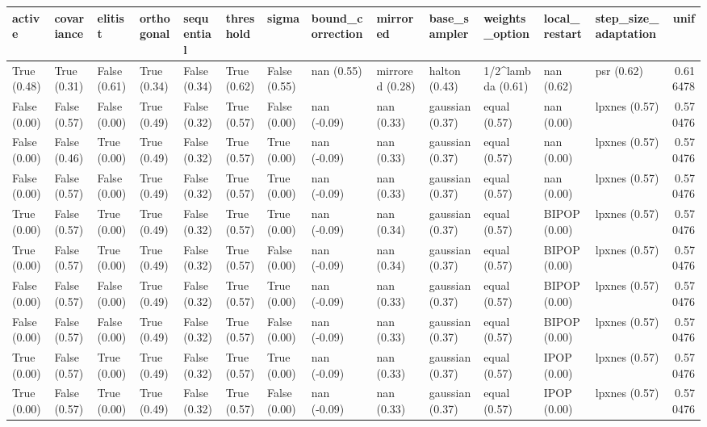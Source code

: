 \begin{tabular}{lllllllllllllr}
\toprule
active & covariance & elitist & orthogonal & sequential & threshold & sigma & bound_correction & mirrored & base_sampler & weights_option & local_restart & step_size_adaptation & unif \\
\midrule
True (0.48) & True (0.31) & False (0.61) & True (0.34) & False (0.34) & True (0.62) & False (0.55) & nan (0.55) & mirrored (0.28) & halton (0.43) & 1/2^lambda (0.61) & nan (0.62) & psr (0.62) & 0.616478 \\
False (0.00) & False (0.57) & False (0.00) & True (0.49) & False (0.32) & True (0.57) & False (0.00) & nan (-0.09) & nan (0.33) & gaussian (0.37) & equal (0.57) & nan (0.00) & lpxnes (0.57) & 0.570476 \\
False (0.00) & False (0.46) & True (0.00) & True (0.49) & False (0.32) & True (0.57) & True (0.00) & nan (-0.09) & nan (0.33) & gaussian (0.37) & equal (0.57) & nan (0.00) & lpxnes (0.57) & 0.570476 \\
False (0.00) & False (0.57) & False (0.00) & True (0.49) & False (0.32) & True (0.57) & True (0.00) & nan (-0.09) & nan (0.33) & gaussian (0.37) & equal (0.57) & nan (0.00) & lpxnes (0.57) & 0.570476 \\
True (0.00) & False (0.57) & True (0.00) & True (0.49) & False (0.32) & True (0.57) & True (0.00) & nan (-0.09) & nan (0.34) & gaussian (0.37) & equal (0.57) & BIPOP (0.00) & lpxnes (0.57) & 0.570476 \\
True (0.00) & False (0.57) & True (0.00) & True (0.49) & False (0.32) & True (0.57) & False (0.00) & nan (-0.09) & nan (0.34) & gaussian (0.37) & equal (0.57) & BIPOP (0.00) & lpxnes (0.57) & 0.570476 \\
False (0.00) & False (0.57) & False (0.00) & True (0.49) & False (0.32) & True (0.57) & True (0.00) & nan (-0.09) & nan (0.33) & gaussian (0.37) & equal (0.57) & BIPOP (0.00) & lpxnes (0.57) & 0.570476 \\
False (0.00) & False (0.57) & False (0.00) & True (0.49) & False (0.32) & True (0.57) & False (0.00) & nan (-0.09) & nan (0.33) & gaussian (0.37) & equal (0.57) & BIPOP (0.00) & lpxnes (0.57) & 0.570476 \\
True (0.00) & False (0.57) & True (0.00) & True (0.49) & False (0.32) & True (0.57) & True (0.00) & nan (-0.09) & nan (0.33) & gaussian (0.37) & equal (0.57) & IPOP (0.00) & lpxnes (0.57) & 0.570476 \\
True (0.00) & False (0.57) & True (0.00) & True (0.49) & False (0.32) & True (0.57) & False (0.00) & nan (-0.09) & nan (0.33) & gaussian (0.37) & equal (0.57) & IPOP (0.00) & lpxnes (0.57) & 0.570476 \\

\end{tabular}
